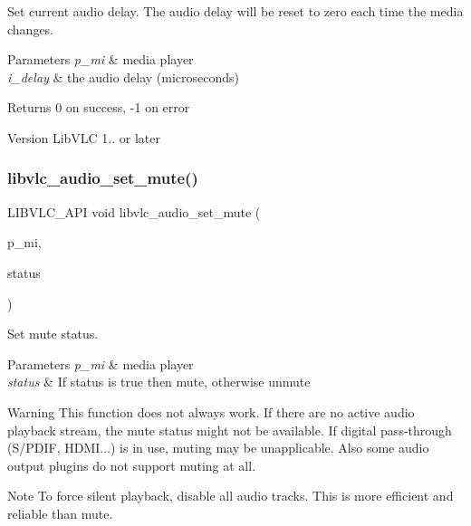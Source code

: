 Set current audio delay. The audio delay will be reset to zero each time the media changes.


\begin{DoxyParams}{Parameters}
{\em p\+\_\+mi} & media player \\
\hline
{\em i\+\_\+delay} & the audio delay (microseconds) \\
\hline
\end{DoxyParams}
\begin{DoxyReturn}{Returns}
0 on success, -\/1 on error 
\end{DoxyReturn}
\begin{DoxyVersion}{Version}
Lib\+V\+LC 1.. or later 
\end{DoxyVersion}
\mbox{\label{group__libvlc__audio_ga438620a3c817b8b4faceb77c476b89fe}} 
\subsubsection{\texorpdfstring{libvlc\+\_\+audio\+\_\+set\+\_\+mute()}{libvlc\_audio\_set\_mute()}}
{\footnotesize\ttfamily L\+I\+B\+V\+L\+C\+\_\+\+A\+PI void libvlc\+\_\+audio\+\_\+set\+\_\+mute (\begin{DoxyParamCaption}\item[{libvlc\+\_\+media\+\_\+player\+\_\+t $\ast$}]{p\+\_\+mi,  }\item[{int}]{status }\end{DoxyParamCaption})}

Set mute status.


\begin{DoxyParams}{Parameters}
{\em p\+\_\+mi} & media player \\
\hline
{\em status} & If status is true then mute, otherwise unmute \\
\hline
\end{DoxyParams}
\begin{DoxyWarning}{Warning}
This function does not always work. If there are no active audio playback stream, the mute status might not be available. If digital pass-\/through (S/\+P\+D\+IF, H\+D\+MI...) is in use, muting may be unapplicable. Also some audio output plugins do not support muting at all. 
\end{DoxyWarning}
\begin{DoxyNote}{Note}
To force silent playback, disable all audio tracks. This is more efficient and reliable than mute. 
\end{DoxyNote}
\mbox{\label{group__libvlc__audio_gae013e4cf0ae73c093f1a1da1af765d21}} 
